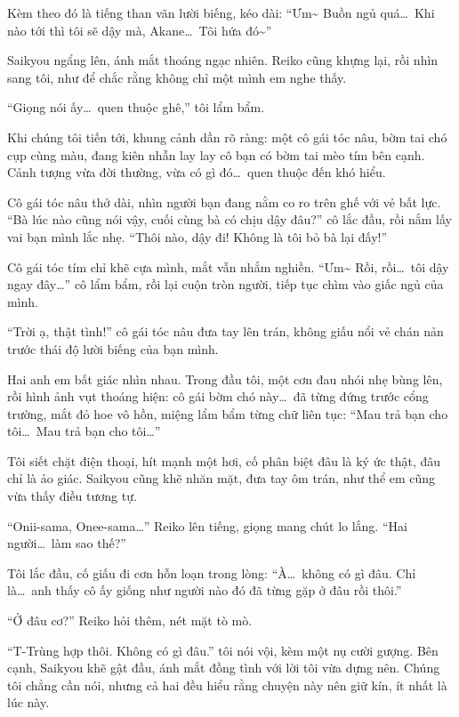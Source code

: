 \documentclass[../main.tex]{subfiles}
\begin{document}
Kèm theo đó là tiếng than vãn lười biếng, kéo dài: ``Ưm\~{} Buồn ngủ quá\dots\ Khi nào tới thì tôi sẽ dậy mà, Akane\dots\ Tôi hứa đó\~{}''

Saikyou ngẩng lên, ánh mắt thoáng ngạc nhiên. Reiko cũng khựng lại, rồi nhìn sang tôi, như để chắc rằng không chỉ một mình em nghe thấy.

``Giọng nói ấy\dots\ quen thuộc ghê,'' tôi lẩm bẩm.

Khi chúng tôi tiến tới, khung cảnh dần rõ ràng: một cô gái tóc nâu, bờm tai chó cụp cùng màu, đang kiên nhẫn lay lay cô bạn có bờm tai mèo tím bên cạnh. Cảnh tượng vừa đời thường, vừa có gì đó\dots\ quen thuộc đến khó hiểu.


Cô gái tóc nâu thở dài, nhìn người bạn đang nằm co ro trên ghế với vẻ bất lực. ``Bà lúc nào cũng nói vậy, cuối cùng bà có chịu dậy đâu?'' cô lắc đầu, rồi nắm lấy vai bạn mình lắc nhẹ. ``Thôi nào, dậy đi! Không là tôi bỏ bà lại đấy!''

Cô gái tóc tím chỉ khẽ cựa mình, mắt vẫn nhắm nghiền. ``Ưm\~{} Rồi, rồi\dots\ tôi dậy ngay đây\dots'' cô lẩm bẩm, rồi lại cuộn tròn người, tiếp tục chìm vào giấc ngủ của mình.

``Trời ạ, thật tình!'' cô gái tóc nâu đưa tay lên trán, không giấu nổi vẻ chán nản trước thái độ lười biếng của bạn mình.

Hai anh em bất giác nhìn nhau. Trong đầu tôi, một cơn đau nhói nhẹ bùng lên, rồi hình ảnh vụt thoáng hiện: cô gái bờm chó này\dots\ đã từng đứng trước cổng trường, mắt đỏ hoe vô hồn, miệng lẩm bẩm từng chữ liên tục: ``Mau trả bạn cho tôi\dots\ Mau trả bạn cho tôi\dots''

Tôi siết chặt điện thoại, hít mạnh một hơi, cố phân biệt đâu là ký ức thật, đâu chỉ là ảo giác. Saikyou cũng khẽ nhăn mặt, đưa tay ôm trán, như thể em cũng vừa thấy điều tương tự.

``Onii-sama, Onee-sama\dots'' Reiko lên tiếng, giọng mang chút lo lắng. ``Hai người\dots\ làm sao thế?''

Tôi lắc đầu, cố giấu đi cơn hỗn loạn trong lòng: ``À\dots\ không có gì đâu. Chỉ là\dots\ anh thấy cô ấy giống như người nào đó đã từng gặp ở đâu rồi thôi.''

``Ở đâu cơ?'' Reiko hỏi thêm, nét mặt tò mò.

``T-Trùng hợp thôi. Không có gì đâu.'' tôi nói vội, kèm một nụ cười gượng. Bên cạnh, Saikyou khẽ gật đầu, ánh mắt đồng tình với lời tôi vừa dựng nên. Chúng tôi chẳng cần nói, nhưng cả hai đều hiểu rằng chuyện này nên giữ kín, ít nhất là lúc này.
\end{document}
